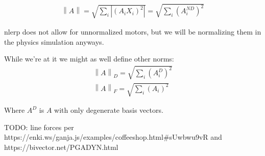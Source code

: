 \documentclass[twoside]{article}
\newcommand{\B}[1]{\left(#1\right)} %
\newcommand{\norm}[1]{{\left\lVert{#1}\right\rVert}}
\newcommand{\aside}[1]{\begin{flushright}\scriptsize{#1}\end{flushright}}
\begin{document}
\begin{multicols*}{2}
\begin{gather*}
                    \norm{A} = \sqrt{\sum_i |\B{A_i X_i}^2|} = \sqrt{\sum_i \B{A^{ND}_i}^2}
                \end{gather*}
                \aside{nlerp does not allow for unnormalized motors, but we will be normalizing them in the physics simulation anyways.}
            \par
                While we're at it we might as well define other norms:
                \begin{gather*}
                    \norm{A}_D = \sqrt{\sum_i \B{A^D_i}^2} \\
                    \norm{A}_F = \sqrt{\sum_i \B{A_i}^2}
                \end{gather*}
                \aside{Where $ A^D $ is $ A $ with only degenerate basis vectors.}
            \par
                TODO: line forces per https://enki.ws/ganja.js/examples/coffeeshop.html\#sUwbwu9vR and https://bivector.net/PGADYN.html
    \end{multicols*}
\end{document}
